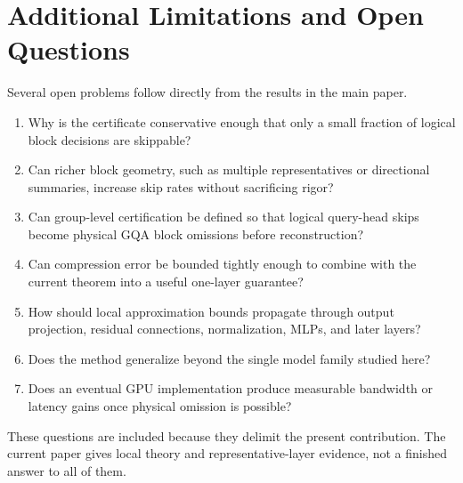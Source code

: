 \section{Additional Limitations and Open Questions}
\label{app:addl-limits}

Several open problems follow directly from the results in the main paper.
\begin{enumerate}[leftmargin=1.6em]
  \item Why is the certificate conservative enough that only a small fraction of logical block decisions are skippable?
  \item Can richer block geometry, such as multiple representatives or directional summaries, increase skip rates without sacrificing rigor?
  \item Can group-level certification be defined so that logical query-head skips become physical GQA block omissions before reconstruction?
  \item Can compression error be bounded tightly enough to combine with the current theorem into a useful one-layer guarantee?
  \item How should local approximation bounds propagate through output projection, residual connections, normalization, MLPs, and later layers?
  \item Does the method generalize beyond the single model family studied here?
  \item Does an eventual GPU implementation produce measurable bandwidth or latency gains once physical omission is possible?
\end{enumerate}

These questions are included because they delimit the present contribution. The current paper gives local theory and representative-layer evidence, not a finished answer to all of them.
